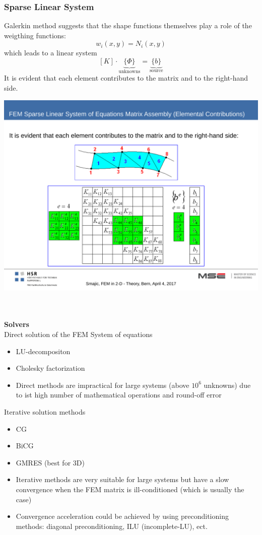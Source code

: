 \subsubsection{Sparse Linear System}
\begin{minipage}[lt]{13cm}
	Galerkin method suggests that the shape functions themselves play a role of the weigthing functions: 
	\begin{equation*}
		w_i(x,y) = N_i(x,y)
	\end{equation*}
	which leads to a linear system 
	\begin{equation*}	
		\left[K\right] \cdot \underbrace{\{\Phi\}}_{\textrm{unknowns}} = \underbrace{\{b\}}_{\textrm{source}}
	\end{equation*}
	It is evident that each element contributes to the matrix and to the right-hand side. 
\end{minipage}
\begin{minipage}[rt]{7cm}
	\begin{centering}
		\includegraphics[width=.85\textwidth]{./images/sparse.pdf}
	\end{centering}
\end{minipage}

\textbf{\\ \\Solvers \\}
Direct solution of the FEM System of equations
\begin{itemize}
	\item LU-decompositon
	\item Cholesky factorization
	\item Direct methods are impractical for large systems (above $10^6$ unknowns) due to ist high number of mathematical operations and round-off error
\end{itemize}
Iterative solution methods
\begin{itemize}
	\item CG
	\item BiCG
	\item GMRES (best for 3D)
	\item Iterative methods are very suitable for large systems but have a slow convergence when the FEM matrix is ill-conditioned (which is usually the case)
	\item Convergence acceleration could be achieved by using preconditioning methods: diagonal preconditioning, ILU (incomplete-LU), ect. 
\end{itemize}

